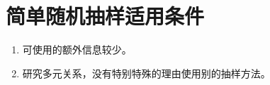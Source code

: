 \section{简单随机抽样适用条件}
\begin{enumerate}
	\item 可使用的额外信息较少。
	\item 研究多元关系，没有特别特殊的理由使用别的抽样方法。
\end{enumerate}